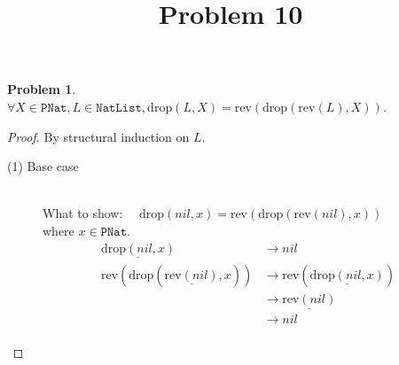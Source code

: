 \documentclass[12pt, a4paper]{article}
\title{Problem 10}
\date{\vspace{-5ex}}
\newtheorem{problem}{Problem}
\newcommand{\rmx}[1]{\mathrm{#1}}
\newcommand{\larrow}{\longrightarrow}
\newcommand{\under}{\underline}
\begin{document}
\maketitle

\begin{problem}
$\forall X \in \mathtt{PNat}, L \in \mathtt{NatList}, \rmx{drop}(L, X) = \rmx{rev}(\rmx{drop}(\rmx{rev}(L), X))$.
\end{problem}
\begin{proof}
By structural induction on $L$.

\begin{description}
\item[(1) Base case]~\\
\noindent
What to show: $\quad \rmx{drop}(nil, x) = \rmx{rev}(\rmx{drop}(\rmx{rev}(nil), x))$ \\
where $x \in \mathtt{PNat}$.
\begin{align*}
\under{\rmx{drop}(nil, x)}
	&\larrow nil \tag{by drop1} \\
\rmx{rev}(\rmx{drop}(\under{\rmx{rev}(nil)}, x))
	&\larrow \rmx{rev}(\under{\rmx{drop}(nil, x)}) \tag{by rev1} \\
	&\larrow \under{\rmx{rev}(nil)} \tag{by drop1} \\
	&\larrow nil \tag{by rev1} \\
\end{align*}


\end{description}
\end{proof}
\end{document}
